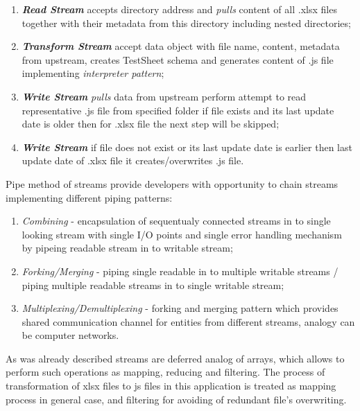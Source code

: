 \begin{enumerate}
	\item \textbf{\textit{Read Stream}} accepts directory address and \textit{pulls} content of all .xlsx files together with their metadata  from this directory including nested directories;
	\item \textbf{\textit{Transform Stream}} accept data object with file name, content, metadata from upstream, creates TestSheet schema and generates content of .js file implementing \textit{interpreter pattern}; 
	\item \textbf{\textit{Write Stream}} \textit{pulls} data from upstream perform attempt to read representative .js file from specified folder if file exists and its last update date is older then for .xlsx file the next step will be skipped;
	\item \textbf{\textit{Write Stream}} if file does not exist or its last update date is earlier then last update date of .xlsx file it creates/overwrites .js file.
\end{enumerate}

Pipe method of streams provide developers with opportunity to chain streams implementing different piping patterns:
\begin{enumerate}
	\item \textit{Combining} - encapsulation of sequentualy connected streams in to single looking stream with single I/O points and single error handling mechanism by pipeing readable stream in to writable stream;
	\item \textit{Forking/Merging} - piping single readable in to multiple writable streams /  piping multiple readable streams in to single writable stream;
	\item \textit{Multiplexing/Demultiplexing} - forking and merging pattern which provides shared communication channel for entities from different streams, analogy can be computer networks.
\end{enumerate}

As was already described streams are deferred analog of arrays, which allows to perform such operations as mapping, reducing and filtering. The process of transformation of xlsx files to js files in this application is treated as mapping process in general case, and filtering for avoiding of redundant file's overwriting.


